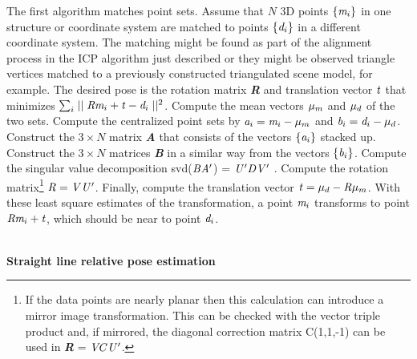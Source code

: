 \documentclass[twocolumn,oneside]{book}
\begin{document}
The first algorithm matches point sets. Assume that $N$ 3D points
$\{ {\bf \it m}_i\}$ in one structure or coordinate system 
are matched to points $\{ {\bf \it d}_i\}$ in a different coordinate system.
The matching might be found as part of the alignment process in the
ICP algorithm just described or they might be observed triangle vertices
matched to a previously constructed triangulated scene model, for example.
The desired pose is the rotation matrix {\bf \it R} and translation vector
${\bf \it t}$ that minimizes $\sum_i \mid\mid {\bf \it R}{\bf \it m}_i + {\bf \it t} - {\bf \it d}_i \mid\mid^2$.
Compute the mean vectors ${\bf \it \mu}_m$ and ${\bf \it \mu}_d$ of the two sets.
Compute the centralized point sets by
${\bf \it a}_i = {\bf \it m}_i - {\bf \it \mu}_m$ and
${\bf \it b}_i = {\bf \it d}_i - {\bf \it \mu}_d$.
Construct the $3 \times N$ matrix {\bf \it A} that consists
of the vectors $\{ {\bf \it a}_i \}$ stacked up.
Construct the $3 \times N$ matrices {\bf \it B} in a similar way from the
vectors $\{ {\bf \it b}_i \}$.
Compute the singular value decomposition svd(${\bf \it B}{\bf \it A'}$) = 
${\bf \it U'}{\bf \it D}{\bf \it V'}$ \cite{arun}.
Compute the rotation matrix\footnote{If the data points are nearly planar
then this calculation can introduce a mirror image transformation.
This can be checked with the vector triple product and,
if mirrored, the diagonal correction matrix C(1,1,-1) can be used in
{\bf \it R} = ${\bf \it V}{\bf \it C}{\bf \it U'}$.}
${\bf \it R} = {\bf \it V}{\bf \it U'}$.
Finally, compute the translation vector ${\bf \it t} = {\bf \it \mu}_d - {\bf \it R}{\bf \it \mu}_m$.
With these least square estimates of the transformation, a point ${\bf \it m}_i$
transforms to point ${\bf \it R}{\bf \it m}_i + {\bf \it t}$, which should
be near to point ${\bf \it d}_i$.

\ \\
\noindent
{\bf Straight line relative pose estimation}
\end{document}
